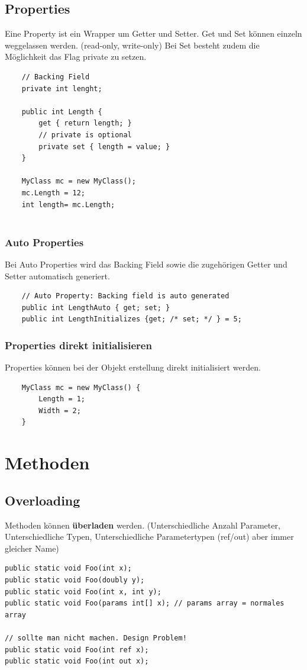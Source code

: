 \subsection{Properties}
Eine Property ist ein Wrapper um Getter und Setter. Get und Set können einzeln weggelassen werden. (read-only, write-only) Bei Set besteht zudem die Möglichkeit das Flag private zu setzen. 
\begin{lstlisting}
	// Backing Field
	private int lenght;
	
	public int Length {
		get { return length; }
		// private is optional
		private set { length = value; } 
	}
	
	MyClass mc = new MyClass();
	mc.Length = 12;
	int length= mc.Length;
	
\end{lstlisting}

\subsubsection{Auto Properties}
Bei Auto Properties wird das Backing Field sowie die zugehörigen Getter und Setter automatisch generiert.
\begin{lstlisting}
	// Auto Property: Backing field is auto generated
	public int LengthAuto { get; set; }
	public int LengthInitializes {get; /* set; */ } = 5;
\end{lstlisting}

\subsubsection{Properties direkt initialisieren}
Properties können bei der Objekt erstellung direkt initialisiert werden. 
\begin{lstlisting}
	MyClass mc = new MyClass() {
		Length = 1;
		Width = 2;
	}
\end{lstlisting}

\section{Methoden}
\subsection{Overloading}
Methoden können \textbf{überladen} werden. (Unterschiedliche Anzahl Parameter, Unterschiedliche Typen, Unterschiedliche Parametertypen (ref/out) aber immer gleicher Name)
\begin{lstlisting}
public static void Foo(int x);
public static void Foo(doubly y);
public static void Foo(int x, int y);
public static void Foo(params int[] x); // params array = normales array

// sollte man nicht machen. Design Problem!
public static void Foo(int ref x);
public static void Foo(int out x);
\end{lstlisting}

